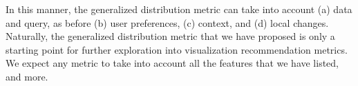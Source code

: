 In this manner, the generalized distribution metric can take into
account (a) data and query, as before
(b) user preferences, (c) context,
and (d) local changes.
Naturally, the generalized distribution metric that
we have proposed is only a starting point for further exploration
into visualization recommendation metrics.
We expect any metric to take into account all the features
that we have listed, and more.






